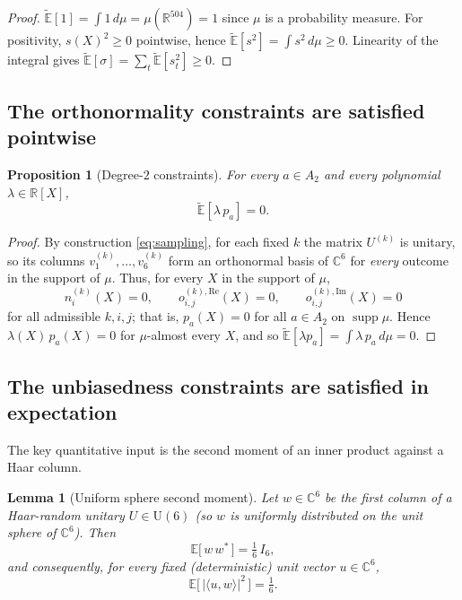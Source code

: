 \documentclass{amsart}
\newtheorem{lemma}{Lemma}
\newtheorem{proposition}{Proposition}
\theoremstyle{definition}
\begin{document}
\begin{proof}
$\widetilde{\mathbb{E}}[1]=\int 1\,d\mu=\mu(\mathbb{R}^{504})=1$ since $\mu$ is a probability
measure. For positivity, $s(X)^2\ge0$ pointwise, hence
$\widetilde{\mathbb{E}}[s^2]=\int s^2\,d\mu\ge0$. Linearity of the integral gives
$\widetilde{\mathbb{E}}[\sigma]=\sum_t\widetilde{\mathbb{E}}[s_t^2]\ge0$. \qedhere
\end{proof}

\subsection{The orthonormality constraints are satisfied pointwise}

\begin{proposition}[Degree-$2$ constraints]\label{prop:deg2}
For every $a\in A_2$ and every polynomial $\lambda\in\mathbb{R}[X]$,
\[
\widetilde{\mathbb{E}}[\lambda\,p_a]=0 .
\]
\end{proposition}

\begin{proof}
By construction \eqref{eq:sampling}, for each fixed $k$ the matrix $U^{(k)}$ is unitary, so its
columns $v^{(k)}_1,\dots,v^{(k)}_6$ form an orthonormal basis of $\mathbb{C}^6$ for
\emph{every} outcome in the support of $\mu$. Thus, for every $X$ in the support of $\mu$,
\[
n^{(k)}_i(X)=0,\qquad o^{(k),\mathrm{Re}}_{i,j}(X)=0,\qquad o^{(k),\mathrm{Im}}_{i,j}(X)=0
\]
for all admissible $k,i,j$; that is, $p_a(X)=0$ for all $a\in A_2$ on $\operatorname{supp}\mu$.
Hence $\lambda(X)\,p_a(X)=0$ for $\mu$-almost every $X$, and so
$\widetilde{\mathbb{E}}[\lambda p_a]=\int \lambda\,p_a\,d\mu=0$. \qedhere
\end{proof}

\subsection{The unbiasedness constraints are satisfied in expectation}

The key quantitative input is the second moment of an inner product against a Haar column.

\begin{lemma}[Uniform sphere second moment]\label{lem:sphere}
Let $w\in\mathbb{C}^6$ be the first column of a Haar-random unitary $U\in\mathrm{U}(6)$ (so $w$
is uniformly distributed on the unit sphere of $\mathbb{C}^6$). Then
\[
\mathbb{E}\bigl[\,w\,w^{*}\,\bigr]=\tfrac16\,I_6 ,
\]
and consequently, for every fixed (deterministic) unit vector $u\in\mathbb{C}^6$,
\[
\mathbb{E}\bigl[\,|\langle u,w\rangle|^2\,\bigr]=\tfrac16 .
\]
\end{lemma}
\end{document}

